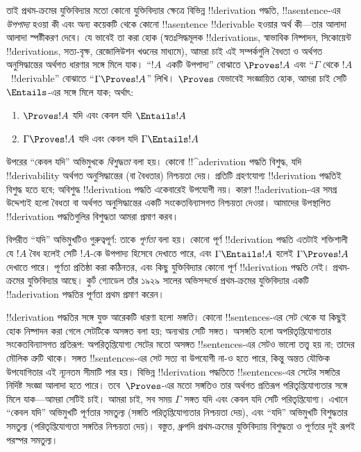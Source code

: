 \documentclass[../../../include/open-logic-section]{subfiles}
\begin{document}
তাই প্রথম-ক্রমের যুক্তিবিদ্যার মতো কোনো যুক্তিবিদ্যার ক্ষেত্রে বিভিন্ন
!!{derivation} পদ্ধতি, !!a{sentence}-এর \emph{উপপাদ্য} হওয়া কী এবং
অন্য কয়েকটি থেকে কোনো !!a{sentence} !!{derivable} হওয়ার অর্থ কী—তার
আলাদা আলাদা স্পষ্টীকরণ দেবে। যে ভাবেই তা করা হোক (স্বতঃসিদ্ধমূলক
!!{derivation}s, স্বাভাবিক নিষ্পাদন, সিকোয়েন্ট !!{derivation}s,
সত্য-বৃক্ষ, রেজোলিউশন খণ্ডনের মাধ্যমে), আমরা চাই এই সম্পর্কগুলি বৈধতা
ও অর্থগত অনুসিদ্ধান্তের অর্থগত ধারণার সঙ্গে মিলে যাক। “$!A$~একটি
উপপাদ্য” বোঝাতে $\Proves !A$ এবং “$\Gamma$ থেকে $!A$~!!{derivable}”
বোঝাতে “$\Gamma \Proves !A$” লিখি। $\Proves$ যেভাবেই সংজ্ঞায়িত হোক,
আমরা চাই সেটি $\Entails$-এর সঙ্গে মিলে যাক; অর্থাৎ:
\begin{enumerate}
\item $\Proves !A$ যদি এবং কেবল যদি $\Entails !A$
\item $\Gamma \Proves !A$ যদি এবং কেবল যদি $\Gamma \Entails !A$
\end{enumerate}
উপরের “কেবল যদি” অভিমুখকে
\emph{বিশুদ্ধতা} বলা হয়। কোনো !!^a{derivation} পদ্ধতি বিশুদ্ধ, যদি
!!{derivability} অর্থগত অনুসিদ্ধান্তের (বা বৈধতার) নিশ্চয়তা দেয়।
প্রতিটি গ্রহণযোগ্য !!{derivation} পদ্ধতিই বিশুদ্ধ হতে হবে; অবিশুদ্ধ
!!{derivation} পদ্ধতি একেবারেই উপযোগী নয়। কারণ !!a{derivation}-এর
সমগ্র উদ্দেশ্যই হলো বৈধতা বা অর্থগত অনুসিদ্ধান্তের একটি সংকেতবিন্যাসগত
নিশ্চয়তা দেওয়া। আমাদের উপস্থাপিত !!{derivation} পদ্ধতিগুলির বিশুদ্ধতা
আমরা প্রমাণ করব।

বিপরীত “যদি” অভিমুখটিও গুরুত্বপূর্ণ: তাকে
\emph{পূর্ণতা} বলা হয়। কোনো পূর্ণ !!{derivation} পদ্ধতি এতটাই শক্তিশালী
যে $!A$ বৈধ হলেই সেটি $!A$-কে উপপাদ্য হিসেবে দেখাতে পারে, এবং
$\Gamma \Entails !A$ হলেই $\Gamma \Proves !A$ দেখাতে পারে।
পূর্ণতা প্রতিষ্ঠা করা কঠিনতর, এবং কিছু যুক্তিবিদ্যার কোনো পূর্ণ
!!{derivation} পদ্ধতি নেই। প্রথম-ক্রমের যুক্তিবিদ্যার আছে। কুর্ট গ্যোডেল
তাঁর ১৯২৯ সালের অভিসন্দর্ভে প্রথম-ক্রমের যুক্তিবিদ্যার একটি
!!a{derivation} পদ্ধতির পূর্ণতা প্রথম প্রমাণ করেন।

!!{derivation} পদ্ধতির সঙ্গে যুক্ত আরেকটি ধারণা হলো
\emph{সঙ্গতি}। কোনো !!{sentence}s-এর সেট থেকে যা কিছুই হোক
নিষ্পাদন করা গেলে সেটটিকে অসঙ্গত বলা হয়; অন্যথায় সেটি সঙ্গত।
অসঙ্গতি হলো অপরিতৃপ্তিযোগ্যতার সংকেতবিন্যাসগত প্রতিরূপ: অপরিতৃপ্তিযোগ্য
সেটের মতো অসঙ্গত !!{sentence}s-এর সেটও ভালো তত্ত্ব হয় না; তাদের মৌলিক
ত্রুটি থাকে। সঙ্গত !!{sentence}s-এর সেট সত্য বা উপযোগী না-ও হতে পারে,
কিন্তু অন্তত যৌক্তিক উপযোগিতার এই ন্যূনতম সীমাটি পার হয়। বিভিন্ন
!!{derivation} পদ্ধতিতে !!{sentence}s-এর সেটের সঙ্গতির নির্দিষ্ট সংজ্ঞা
আলাদা হতে পারে। তবে~$\Proves$-এর মতো সঙ্গতিও তার অর্থগত প্রতিরূপ
পরিতৃপ্তিযোগ্যতার সঙ্গে মিলে যাক—আমরা সেটিই চাই। আমরা চাই, সব সময়
$\Gamma$ সঙ্গত যদি এবং কেবল যদি সেটি পরিতৃপ্তিযোগ্য। এখানে “কেবল যদি”
অভিমুখটি পূর্ণতার সমতুল্য (সঙ্গতি পরিতৃপ্তিযোগ্যতার নিশ্চয়তা দেয়), এবং
“যদি” অভিমুখটি বিশুদ্ধতার সমতুল্য (পরিতৃপ্তিযোগ্যতা সঙ্গতির নিশ্চয়তা
দেয়)। বস্তুত, ধ্রুপদি প্রথম-ক্রমের যুক্তিবিদ্যায় বিশুদ্ধতা ও পূর্ণতার
দুই রূপই পরস্পর সমতুল্য।
\end{document}

